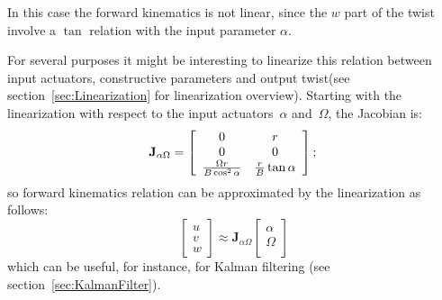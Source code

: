 In this case the forward kinematics is not linear, since the $w$ part of the twist involve a $\tan$ relation with the input parameter $\alpha$. 

For several purposes it might be interesting to linearize this relation between input actuators, constructive parameters and output twist(see section~\ref{sec:Linearization} for linearization overview). Starting with the linearization with respect to the input actuators~$\alpha$ and~$\Omega$, the Jacobian is: 
\begin{equation}
\mathbf{J}_{\alpha \Omega} = 
\left[
 \begin{array}{cc}
  0 & r  \\
  0 & 0  \\
  \frac{\Omega r}{B \cos ^2 \alpha} & \frac{r}{B}\tan \alpha
 \end{array}
 \right]; \\ 
\end{equation}
 so forward kinematics relation can be approximated by the linearization as follows: 
\begin{equation}
 \left[
 \begin{array}{c}
  u \\
  v  \\
  w 
 \end{array}
 \right] \approx \mathbf{J}_{\alpha \Omega}
 \left[
 \begin{array}{c}
  \alpha \\
  \Omega \\
 \end{array} 
 \right]
\end{equation}
which can be useful, for instance, for Kalman filtering (see section~\ref{sec:KalmanFilter}).

